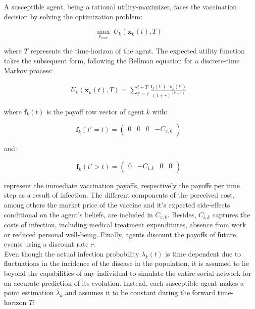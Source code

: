 \documentclass[11pt]{article}
\begin{document}
A susceptible agent, being a rational utility-maximizer, faces the vaccination decision by solving the optimization problem:

\begin{equation}\label{eq:6}
	\max_{{p_{vacc}}} \; U_k(\mathbf{x}_k(t), T)
\end{equation}

where \(T\) represents the time-horizon of the agent. The expected utility function takes the subsequent form, following the Bellman equation for a discrete-time Markov process:

\begin{equation}\label{eq:7}
	\begin{split}
		U_k(\mathbf{x}_k(t), T) = \sum_{t'=t}^{t + T} \frac{  \mathbf{f}_k(t') \cdot \mathbf{x}_k(t')}{(1+r)^{(t'-t)}}
	\end{split}
\end{equation}

where \(\mathbf{f}_k(t)\) is the payoff row vector of agent \(k\) with: 

\begin{equation}\label{eq:8}
	\mathbf{f}_k(t' = t)=\left( \begin{array}{cccc}0&0&0&-C_{v,k} \end{array} \right)
\end{equation}

and:

\begin{equation}\label{eq:9}
\mathbf{f}_k(t' > t)=\left( \begin{array}{cccc} 0&-C_{i,k}&0&0 \end{array} \right)
\end{equation}

represent the immediate vaccination payoffs, respectively the payoffs per time step as a result of infection.  
The different components of the perceived cost, among others the market price of the vaccine and it's expected side-effects conditional on the agent's beliefs, are included in \(C_{v,k}\). Besides, \(C_{i,k}\) captures the costs of infection, including medical treatment expenditures, absence from work or reduced personal well-being. Finally, agents discount the payoffs of future events using a discount rate \(r\).\\
Even though the actual infection probability  \(\lambda_{k}(t)\) is time dependent due to fluctuations in the incidence of the disease in the population, it is assumed to lie beyond the capabilities of any individual to simulate the entire social network for an accurate prediction of its evolution. Instead, each susceptible agent makes a point estimation \(\hat{\lambda}_{k}\) and assumes it to be constant during the forward time-horizon \(T\):
\end{document}
